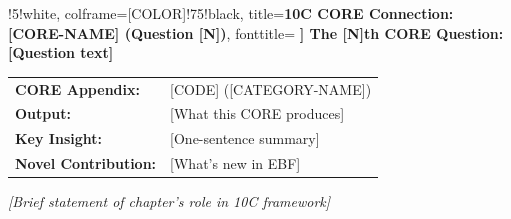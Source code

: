 %
%


%
%
%
\begin{tcolorbox}[
    colback=[COLOR]!5!white,
    colframe=[COLOR]!75!black,
    title={\textbf{10C CORE Connection: [CORE-NAME] (Question [N])}},
    fonttitle=\bfseries
]
\textbf{The [N]th CORE Question:} [Question text]

\medskip
\begin{tabular}{ll}
\textbf{CORE Appendix:} & [CODE] ([CATEGORY-NAME]) \\
\textbf{Output:} & [What this CORE produces] \\
\textbf{Key Insight:} & [One-sentence summary] \\
\textbf{Novel Contribution:} & [What's new in EBF]
\end{tabular}

\medskip
\textit{[Brief statement of chapter's role in 10C framework]}
\end{tcolorbox}


